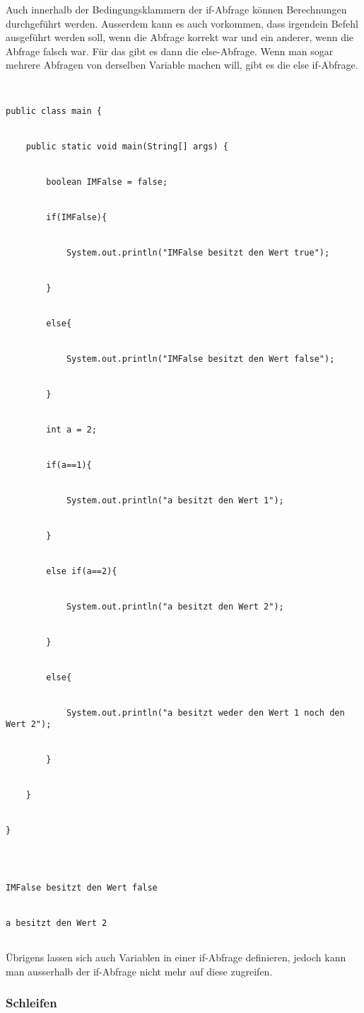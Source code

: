 Auch innerhalb der Bedingungsklammern der if-Abfrage können Berechnungen durchgeführt werden. Ausserdem kann es auch vorkommen, dass irgendein Befehl ausgeführt werden soll, wenn die Abfrage korrekt war und ein anderer, wenn die Abfrage falsch war. Für das gibt es dann die else-Abfrage. Wenn man sogar mehrere Abfragen von derselben Variable machen will, gibt es die else if-Abfrage.


\begin{lstlisting}


public class main {


	public static void main(String[] args) {


		boolean IMFalse = false;


		if(IMFalse){


			System.out.println("IMFalse besitzt den Wert true");


		}


		else{


			System.out.println("IMFalse besitzt den Wert false");


		}


		int a = 2;


		if(a==1){


			System.out.println("a besitzt den Wert 1");


		}


		else if(a==2){


			System.out.println("a besitzt den Wert 2");


		}


		else{


			System.out.println("a besitzt weder den Wert 1 noch den Wert 2");


		}


	}


}	


\end{lstlisting}


\begin{lstlisting}[style=console]


IMFalse besitzt den Wert false


a besitzt den Wert 2


\end{lstlisting}


Übrigens lassen sich auch Variablen in einer if-Abfrage definieren, jedoch kann man ausserhalb der if-Abfrage nicht mehr auf diese zugreifen.


\subsubsection{Schleifen}


